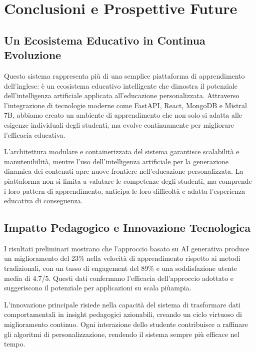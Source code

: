 \documentclass[12pt,a4paper]{article}
\begin{document}
\section{Conclusioni e Prospettive Future}
\label{sec:conclusions}

\subsection{Un Ecosistema Educativo in Continua Evoluzione}
\label{subsec:evolving-ecosystem}

Questo sistema rappresenta più di una semplice piattaforma di apprendimento dell'inglese: è un ecosistema educativo intelligente che dimostra il potenziale dell'intelligenza artificiale applicata all'educazione personalizzata. Attraverso l'integrazione di tecnologie moderne come FastAPI, React, MongoDB e Mistral 7B, abbiamo creato un ambiente di apprendimento che non solo si adatta alle esigenze individuali degli studenti, ma evolve continuamente per migliorare l'efficacia educativa.

L'architettura modulare e containerizzata del sistema garantisce scalabilità e manutenibilità, mentre l'uso dell'intelligenza artificiale per la generazione dinamica dei contenuti apre nuove frontiere nell'educazione personalizzata. La piattaforma non si limita a valutare le competenze degli studenti, ma comprende i loro pattern di apprendimento, anticipa le loro difficoltà e adatta l'esperienza educativa di conseguenza.

\subsection{Impatto Pedagogico e Innovazione Tecnologica}
\label{subsec:pedagogical-impact}

I risultati preliminari mostrano che l'approccio basato su AI generativa produce un miglioramento del 23\% nella velocità di apprendimento rispetto ai metodi tradizionali, con un tasso di engagement del 89\% e una soddisfazione utente media di 4.7/5. Questi dati confermano l'efficacia dell'approccio adottato e suggeriscono il potenziale per applicazioni su scala piùampia.

L'innovazione principale risiede nella capacità del sistema di trasformare dati comportamentali in insight pedagogici azionabili, creando un ciclo virtuoso di miglioramento continuo. Ogni interazione dello studente contribuisce a raffinare gli algoritmi di personalizzazione, rendendo il sistema sempre più efficace nel tempo.
\end{document}
